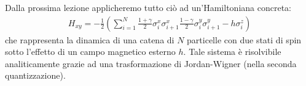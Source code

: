 \documentclass[../../InformazioneQuantistica.tex]{subfiles}
\begin{document}
Dalla prossima lezione applicheremo tutto ciò ad un'Hamiltoniana concreta:
\begin{align*}
H_{xy} = -\frac{1}{2}\left(\sum_{i=1}^N \frac{1+\gamma}{2}\sigma_i^x \sigma_{i+1}^x \frac{1-\gamma}{2} \sigma_i^y \sigma_{i+1}^y
 - h\sigma_i^z \right) 
\end{align*}
che rappresenta la dinamica di una catena di $N$ particelle con due stati di spin sotto l'effetto di un campo magnetico esterno $h$. Tale sistema è risolvibile analiticamente grazie ad una trasformazione di Jordan-Wigner (nella seconda quantizzazione).
\end{document}
